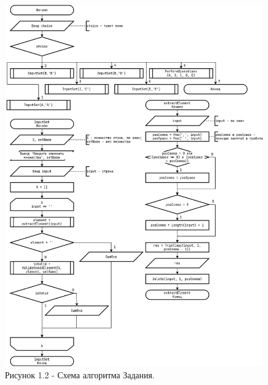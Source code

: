 \documentclass[oneside,a4paper,14pt]{extarticle}
\begin{document}
\clearpage
\begin{figure}[H]
	\centering
	\includegraphics[height=0.9\textheight]{pics/flowchart2.png}
	\caption*{Рисунок 1.2 - Схема алгоритма Задания.}
\end{figure}
\end{document}
